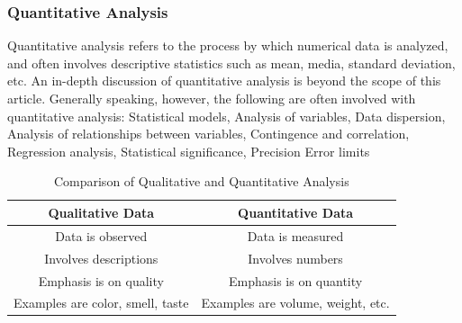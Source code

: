 \documentclass[a4paper,12pt,oneside]{report}
\begin{document}
{\subsubsection{Quantitative Analysis}
{   Quantitative analysis refers to the process by which numerical data is analyzed, and often involves descriptive statistics such as mean, media, standard deviation, etc. An in-depth discussion of quantitative analysis is beyond the scope of this article. Generally speaking, however, the following are often involved with quantitative analysis:
Statistical models, Analysis of variables, Data dispersion, Analysis of relationships between variables, Contingence and correlation, Regression analysis, Statistical significance, Precision Error limits}
\begin{table}
\begin{center}
\begin{tabular}{|c|c|}
\hline
Qualitative Data & Quantitative Data\\
\hline
Data is observed  & Data is measured \\
\hline
Involves descriptions& Involves numbers \\
\hline
Emphasis is on quality&Emphasis is on quantity\\
\hline
Examples are color, smell, taste&Examples are volume, weight, etc.\\
\hline
\end{tabular}
\end{center}
\caption{Comparison of Qualitative and Quantitative Analysis}
\end{table}
}
\end{document}
